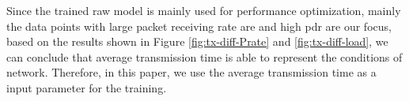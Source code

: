 



 
Since the trained \gls{raw} model is mainly used for performance optimization, mainly the data points with large packet receiving rate are and high \gls{pdr} are our focus, 
based on the results shown in Figure \ref{fig:tx-diff-Prate} and \ref{fig:tx-diff-load}, we can conclude that  average transmission time is able to represent the conditions of network. Therefore, in this paper, we use the average transmission time as a input parameter for the training.
 
